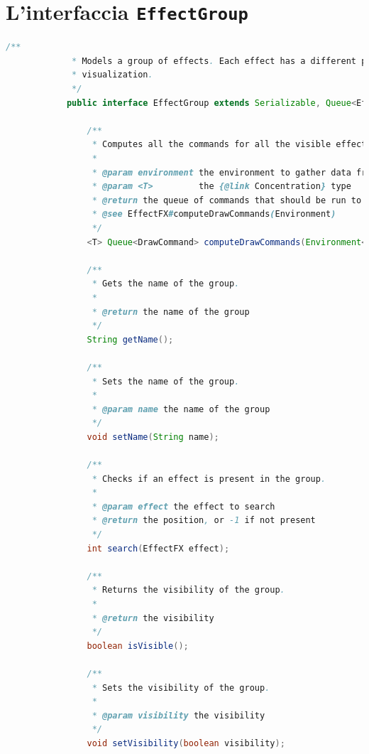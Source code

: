     \section{L'interfaccia \texttt{EffectGroup}}\label{appendix:effectgroup}
        \begin{lstlisting}[language=Java]
            /**
             * Models a group of effects. Each effect has a different priority of
             * visualization.
             */
            public interface EffectGroup extends Serializable, Queue<EffectFX> {

                /**
                 * Computes all the commands for all the visible effects in this group.
                 *
                 * @param environment the environment to gather data from
                 * @param <T>         the {@link Concentration} type
                 * @return the queue of commands that should be run to draw the effects of the group
                 * @see EffectFX#computeDrawCommands(Environment)
                 */
                <T> Queue<DrawCommand> computeDrawCommands(Environment<T> environment);

                /**
                 * Gets the name of the group.
                 *
                 * @return the name of the group
                 */
                String getName();

                /**
                 * Sets the name of the group.
                 *
                 * @param name the name of the group
                 */
                void setName(String name);

                /**
                 * Checks if an effect is present in the group.
                 *
                 * @param effect the effect to search
                 * @return the position, or -1 if not present
                 */
                int search(EffectFX effect);

                /**
                 * Returns the visibility of the group.
                 *
                 * @return the visibility
                 */
                boolean isVisible();

                /**
                 * Sets the visibility of the group.
                 *
                 * @param visibility the visibility
                 */
                void setVisibility(boolean visibility);


\end{lstlisting}
